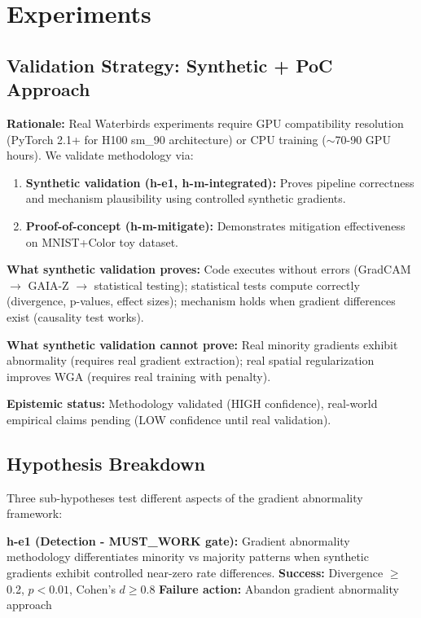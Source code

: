 \section{Experiments}

\subsection{Validation Strategy: Synthetic + PoC Approach}

\textbf{Rationale:} Real Waterbirds experiments require GPU compatibility resolution (PyTorch 2.1+ for H100 sm\_90 architecture) or CPU training ($\sim$70-90 GPU hours). We validate methodology via:

\begin{enumerate}
\item \textbf{Synthetic validation (h-e1, h-m-integrated):} Proves pipeline correctness and mechanism plausibility using controlled synthetic gradients.
\item \textbf{Proof-of-concept (h-m-mitigate):} Demonstrates mitigation effectiveness on MNIST+Color toy dataset.
\end{enumerate}

\textbf{What synthetic validation proves:}
Code executes without errors (GradCAM $\rightarrow$ GAIA-Z $\rightarrow$ statistical testing); statistical tests compute correctly (divergence, p-values, effect sizes); mechanism holds when gradient differences exist (causality test works).

\textbf{What synthetic validation cannot prove:}
Real minority gradients exhibit abnormality (requires real gradient extraction); real spatial regularization improves WGA (requires real training with penalty).

\textbf{Epistemic status:} Methodology validated (HIGH confidence), real-world empirical claims pending (LOW confidence until real validation).

\subsection{Hypothesis Breakdown}

Three sub-hypotheses test different aspects of the gradient abnormality framework:

\textbf{h-e1 (Detection - MUST\_WORK gate):}
Gradient abnormality methodology differentiates minority vs majority patterns when synthetic gradients exhibit controlled near-zero rate differences.
\textbf{Success:} Divergence $\geq$0.2, $p<0.01$, Cohen's $d\geq$0.8
\textbf{Failure action:} Abandon gradient abnormality approach

